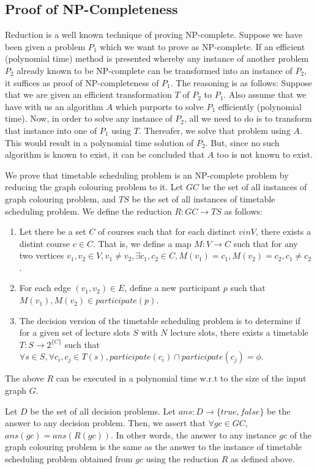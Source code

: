 \documentclass[11pt,a4paper]{article}
\begin{document}
\subsection{Proof of NP-Completeness}
Reduction is a well known technique of proving NP-complete. Suppose we have been given a problem $P_1$ which we want to prove as NP-complete. If an efficient (polynomial time) method is presented whereby any instance of another problem $P_2$ already known to be NP-complete can be transformed into an instance of $P_2$, it suffices as proof of NP-completeness of $P_1$. The reasoning is as follows: Suppose that we are given an efficient transformation $T$ of $P_2$ to $P_1$. Also assume that we have with us an algorithm $A$ which purports to solve $P_1$ efficiently (polynomial time). Now, in order to solve any instance of $P_2$, all we need to do is to transform that instance into one of $P_1$ using $T$. Thereafer, we solve that problem using $A$. This would result in a polynomial time solution of $P_2$. But, since no such algorithm is known to exist, it can be concluded that $A$ too is not known to exist.

We prove that timetable scheduling problem is an NP-complete problem by reducing the graph colouring problem to it. Let $GC$ be the set of all instances of graph colouring problem, and $TS$ be the set of all instances of timetable scheduling problem. We define the reduction $R: GC \rightarrow TS$ as follows:
\begin{enumerate}
	\item Let there be a set $C$ of courses such that for each distinct $v in V$, there exists a distint course $c \in C$. That is, we define a map $M : V \rightarrow C$ such that for any two vertices $v_1, v_2 \in V, v_1 \neq v_2, \exists c_1, c_2 \in C, M(v_1) = c_1, M(v_2) = c_2, c_1 \neq c_2$.
	\item For each edge $(v_1, v_2) \in E$, define a new participant $p$ such that $M(v_1),M(v_2) \in participate(p)$.
	\item The decision version of the timetable scheduling problem is to determine if for a given set of lecture slots $S$ with $N$ lecture slots, there exists a timetable $T: S \rightarrow 2^{\{C\}}$ such that $\forall s \in S, \forall c_i, c_j \in T(s), participate(c_i) \cap participate(c_j) = \phi$. 
\end{enumerate}

The above $R$ can be executed in a polynomial time w.r.t to the size of the input graph $G$.

Let $D$ be the set of all decision problems. Let $ans: D \rightarrow \{true, false\}$ be the answer to any decision problem. Then, we assert that $\forall gc \in GC$, $ans(gc) = ans(R(gc))$. In other words, the answer to any instance $gc$ of the graph colouring problem is the same as the answer to the instance of timetable scheduling problem obtained from $gc$ using the reduction $R$ as defined above.
\end{document}
